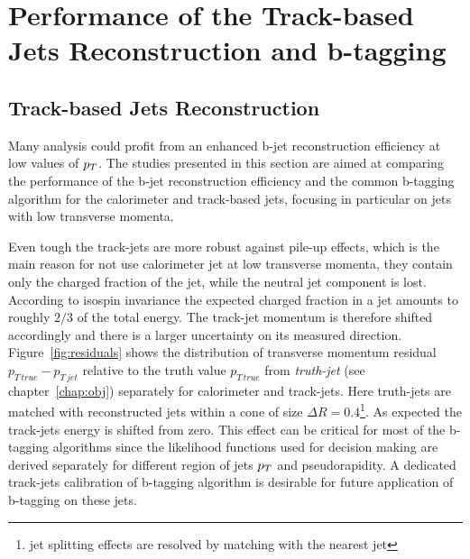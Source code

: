 \section[Performance of the Track-based Jets]{Performance of the Track-based Jets Reconstruction and b-tagging}\label{sec:tj_perf}
\subsection{Track-based Jets Reconstruction}
Many analysis could profit from an enhanced b-jet reconstruction efficiency at low values of $p_{T}$. 
The studies presented in this section are aimed at comparing the  performance of the b-jet reconstruction 
efficiency and the common b-tagging algorithm for the calorimeter and track-based jets, focusing in particular on jets 
with low transverse momenta.

Even tough the track-jets are more robust against  pile-up effects, which is the main reason for 
not use calorimeter jet at low transverse momenta, they contain only the charged fraction of the jet, 
while the neutral jet component is lost.
According to isospin invariance the expected charged fraction in a jet amounts to roughly $2/3$ of the total energy.
The track-jet momentum is therefore shifted accordingly and there is a larger 
uncertainty on its measured direction. Figure~\ref{fig:residuals} shows the 
distribution of transverse momentum residual $p_{T\,true} - p_{T\,jet}$ relative to the truth value $p_{T\,true}$ 
from \emph{truth-jet} (see chapter~\ref{chap:obj}) separately for calorimeter and track-jets.
Here truth-jets are matched with reconstructed jets within a cone of size  $\Delta R = 0.4$\footnote{jet splitting effects are resolved by matching with the nearest jet}.
As expected the track-jets energy is shifted from zero. This effect can be critical for most of the b-tagging algorithms 
since the likelihood functions used for decision making are derived separately for different region
of jets $p_{T}$ and pseudorapidity. A dedicated track-jets calibration of b-tagging algorithm is desirable 
for  future application of b-tagging on these jets.

